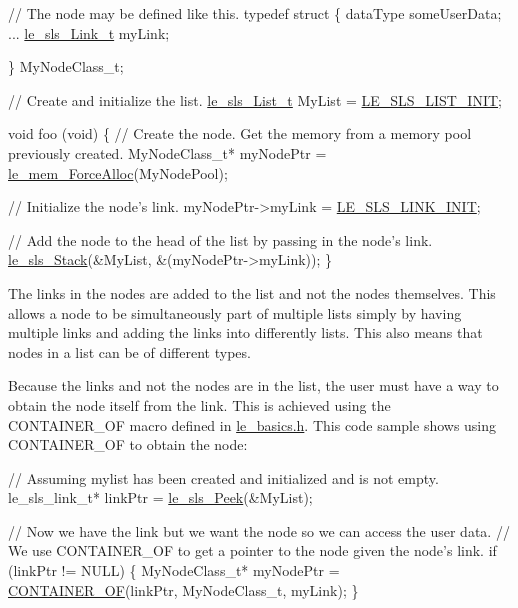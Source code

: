\begin{DoxyCode}
\textcolor{comment}{// The node may be defined like this.}
\textcolor{keyword}{typedef} \textcolor{keyword}{struct}
\{
     dataType someUserData;
     ...
     \hyperlink{structle__sls___link__t}{le\_sls\_Link\_t} myLink;

\}
MyNodeClass\_t;

\textcolor{comment}{// Create and initialize the list.}
\hyperlink{structle__sls___list__t}{le\_sls\_List\_t} MyList = \hyperlink{le__singly_linked_list_8h_a2e1013c24e2c826dbba37a761c5d9f44}{LE\_SLS\_LIST\_INIT};

\textcolor{keywordtype}{void} foo (\textcolor{keywordtype}{void})
\{
    \textcolor{comment}{// Create the node.  Get the memory from a memory pool previously created.}
    MyNodeClass\_t* myNodePtr = \hyperlink{le__mem_8h_af7c289c73d4182835a26a9099f3db359}{le\_mem\_ForceAlloc}(MyNodePool);

    \textcolor{comment}{// Initialize the node's link.}
    myNodePtr->myLink = \hyperlink{le__singly_linked_list_8h_aa8375976bebc74107b4d026dfcf3e94a}{LE\_SLS\_LINK\_INIT};

    \textcolor{comment}{// Add the node to the head of the list by passing in the node's link.}
    \hyperlink{le__singly_linked_list_8h_aca4266a87d4c5e3dca130cd5d48b99af}{le\_sls\_Stack}(&MyList, &(myNodePtr->myLink));
\}
\end{DoxyCode}


The links in the nodes are added to the list and not the nodes themselves. This allows a node to be simultaneously part of multiple lists simply by having multiple links and adding the links into differently lists. This also means that nodes in a list can be of different types.

Because the links and not the nodes are in the list, the user must have a way to obtain the node itself from the link. This is achieved using the {\ttfamily C\+O\+N\+T\+A\+I\+N\+E\+R\+\_\+\+O\+F} macro defined in \hyperlink{le__basics_8h}{le\+\_\+basics.\+h}. This code sample shows using C\+O\+N\+T\+A\+I\+N\+E\+R\+\_\+\+O\+F to obtain the node\+:


\begin{DoxyCode}
\textcolor{comment}{// Assuming mylist has been created and initialized and is not empty.}
le\_sls\_link\_t* linkPtr = \hyperlink{le__singly_linked_list_8h_a63e301829d4a513c97dbda3943efa791}{le\_sls\_Peek}(&MyList);

\textcolor{comment}{// Now we have the link but we want the node so we can access the user data.}
\textcolor{comment}{// We use CONTAINER\_OF to get a pointer to the node given the node's link.}
\textcolor{keywordflow}{if} (linkPtr != NULL)
\{
    MyNodeClass\_t* myNodePtr = \hyperlink{le__basics_8h_a3616d3fd5b502150b643ddc769f71188}{CONTAINER\_OF}(linkPtr, MyNodeClass\_t, myLink);
\}
\end{DoxyCode}


